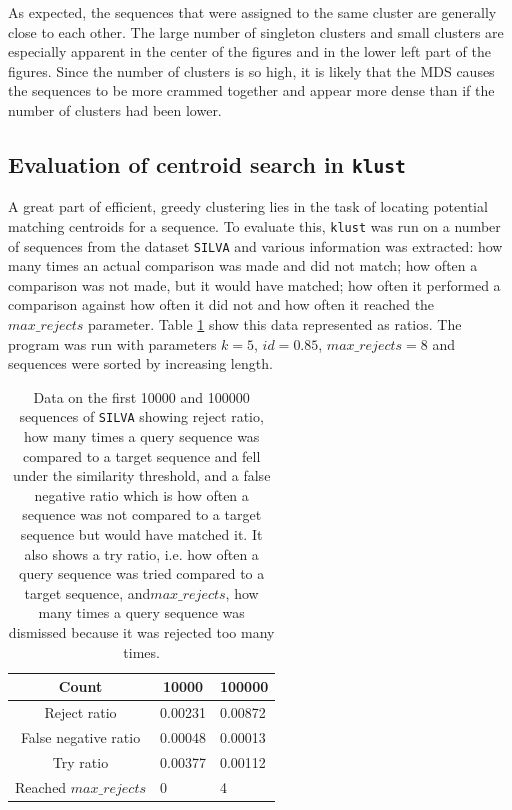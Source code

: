 As expected, the sequences that were assigned to the same cluster are
generally close to each other. The large number of singleton clusters and
small clusters are especially apparent in the center of the figures and in the
lower left part of the figures. Since the number of clusters is so high, it is
likely that the MDS causes the sequences to be more crammed together and
appear more dense than if the number of clusters had been lower.


\subsection{Evaluation of centroid search in \texttt{klust}}
\label{sec:evaluation_centroid_search}

A great part of efficient, greedy clustering lies in the task of locating
potential matching centroids for a sequence. To evaluate this, \texttt{klust}
was run on a number of sequences from the dataset \texttt{SILVA} and various
information was extracted: how many times an actual comparison was made and did
not match; how often a comparison was not made, but it would have matched; how
often it performed a comparison against how often it did not and how often it
reached the $max\_rejects$ parameter. Table \ref{tab:centroid_search_data} show
this data represented as ratios. The program was run with parameters $k=5$,
$id=0.85$, $max\_rejects=8$ and sequences were sorted by increasing length.

\begin{table}[H]
  \centering
  \begin{tabular}{c||l|l}
  Count                 & \multicolumn{1}{c|}{\num{10000}} & \multicolumn{1}{c}{\num{100000}} \\
  \hline\hline
  Reject ratio          & 0.00231  & 0.00872 \\
  \hline
  False negative ratio  & 0.00048  & 0.00013 \\
  \hline
  Try ratio             & 0.00377  & 0.00112 \\
  \hline
  Reached $max\_rejects$ & 0           & 4 \\
  \end{tabular}
  \caption{Data on the first \num{10000} and \num{100000} sequences of
  \texttt{SILVA} showing reject ratio, how many times a query sequence was
  compared to a target sequence and fell under the similarity threshold, and
  a false negative ratio which is how often a sequence was not compared to a
  target sequence but would have matched it. It also shows a try ratio, i.e. how
  often a query sequence was tried compared to a target sequence, and$max\_rejects$, how many
  times a query sequence was dismissed because it was rejected too many times.}
  \label{tab:centroid_search_data}
\end{table}

